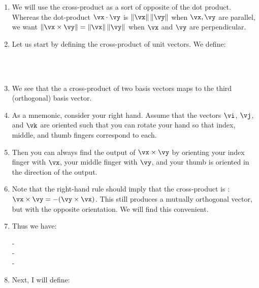 \begin{enumerate}
  \item We will use the cross-product as a sort of opposite of the dot
  product. Whereas the dot-product $\vx \cdot \vy$ is $\norm{\vx}
  \norm{\vy}$ when $\vx, \vy$ are parallel, we want $\norm{\vx \cross
  \vy} = \norm{\vx} \norm{\vy}$ when $\vx$ and $\vy$ are perpendicular.

  \item Let us start by defining the cross-product of unit vectors. We
  define:

  \begin{nedqn}
    \vi \cross \vj
  \eqcol
    \vk
  \\
    \vj \cross \vk
  \eqcol
    \vi
  \\
    \vk \cross \vi
  \eqcol
    \vj
  \end{nedqn}

  \item We see that the a cross-product of two basis vectors maps to the
  third (orthogonal) basis vector.

  \item As a mnemonic, consider your right hand. Assume that the vectors
  $\vi$, $\vj$, and $\vk$ are oriented such that you can rotate your
  hand so that index, middle, and thumb fingers correspond to each.

  \item Then you can always find the output of $\vx \cross \vy$ by
  orienting your index finger with $\vx$, your middle finger with $\vy$,
  and your thumb is oriented in the direction of the output.

  \item Note that the right-hand rule should imply that the
  cross-product is : $\vx \cross \vy =
  -\parens{\vy \cross \vx}$. This still produces a mutually orthogonal
  vector, but with the opposite orientation. We will find this
  convenient.

  \item Thus we have:

  \begin{nedqn}
    \vj \cross \vi
  \eqcol
    -\vk
  \\
    \vk \cross \vj
  \eqcol
    -\vi
  \\
    \vi \cross \vk
  \eqcol
    -\vj
  \end{nedqn}

  \item Next, I will define:


\end{enumerate}
